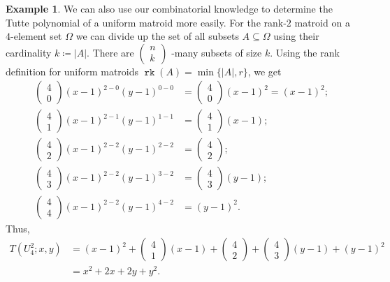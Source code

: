 \documentclass[12pt,a4paper, twoside, autooneside=false]{scrartcl}
\theoremstyle{definition}
\newtheorem{beispiel}[theorem]{Example}
\theoremstyle{remark}
\numberwithin{equation}{section}
\DeclareMathOperator{\rk}{\mathtt{rk}}
\begin{document}
\begin{beispiel}
We can also use our combinatorial knowledge to determine the Tutte polynomial of a uniform matroid more easily. For the rank-$2$ matroid on a $4$-element set $\Omega$ we can divide up the set of all subsets $A \subseteq \Omega$ using their cardinality $k \coloneqq |A|$. There are $ \begin{pmatrix}
n \\
k
\end{pmatrix} $ -many subsets of size $k$. Using the rank definition for uniform matroids $\rk(A) = \min\{|A|, r\}$,  we get 
\begin{align*}
\begin{pmatrix}
4 \\
0
\end{pmatrix} (x - 1)^{2 - 0} (y - 1)^{0 - 0} &= \begin{pmatrix}
4 \\
0
\end{pmatrix}(x - 1)^2 = (x - 1)^2; \\
\begin{pmatrix}
4 \\
1
\end{pmatrix}(x - 1)^{2 - 1} (y - 1)^{1 - 1} &= \begin{pmatrix}
4 \\
1
\end{pmatrix}(x - 1); \\ 
\begin{pmatrix}
4 \\
2
\end{pmatrix}(x - 1)^{2 - 2} (y - 1)^{2 - 2} &= \begin{pmatrix}
4 \\
2
\end{pmatrix};\\
\begin{pmatrix}
4 \\
3
\end{pmatrix}(x - 1)^{2 - 2}(y - 1)^{3 - 2} &= \begin{pmatrix}
4 \\
3
\end{pmatrix}(y - 1); \\ 
\begin{pmatrix}
4 \\
4
\end{pmatrix}(x - 1)^{2 - 2} (y - 1)^{4 - 2} &= (y - 1)^2 . 
\end{align*}
Thus, 
\begin{align*}
T(U_4^2; x,y) &= (x - 1)^2 + \begin{pmatrix}
4 \\
1
\end{pmatrix}(x - 1) + \begin{pmatrix}
4 \\
2
\end{pmatrix} + \begin{pmatrix}
4 \\
3
\end{pmatrix}(y - 1) + (y - 1)^2 \\ 
&= x^2 + 2x + 2y + y^2.
\end{align*}
\end{beispiel}
\end{document}
